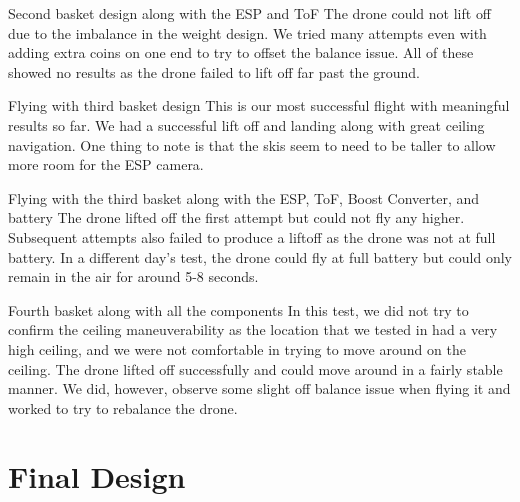 \documentclass[12pt]{article}
\begin{document}
                 {Second basket design along with the ESP and ToF} {
                    The drone could not lift off due to the imbalance in the weight design.
                    We tried many attempts even with adding extra coins on one end to try to offset the balance issue.
                    All of these showed no results as the drone failed to lift off far past the ground.
                }

                 {Flying with third basket design} {
                    This is our most successful flight with meaningful results so far.
                    We had a successful lift off and landing along with great ceiling navigation.
                    One thing to note is that the skis seem to need to be taller to allow more room for the ESP camera.
                }

                 {Flying with the third basket along with the ESP, ToF, Boost Converter, and battery} {
                    The drone lifted off the first attempt but could not fly any higher.
                    Subsequent attempts also failed to produce a liftoff as the drone was not at full battery.
                    In a different day's test, the drone could fly at full battery but could only remain in the air for around 5-8 seconds.
                }

                 {Fourth basket along with all the components} {
                    In this test, we did not try to confirm the ceiling maneuverability as the location that we tested in had a very high ceiling, and we were not comfortable in trying to move around on the ceiling.
                    The drone lifted off successfully and could move around in a fairly stable manner.
                    We did, however, observe some slight off balance issue when flying it and worked to try to rebalance the drone.
                }
    
    \newpage
    \section{Final Design}
\end{document}
